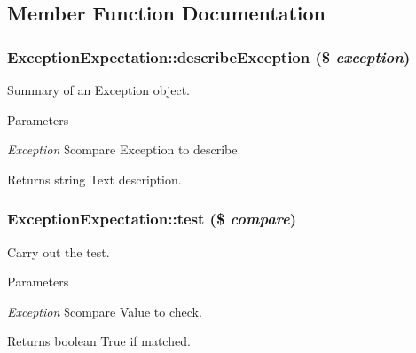 \subsection{Member Function Documentation}
\hypertarget{class_exception_expectation_a4f7a76d97a172afd6d3c60ce42ab01f6}{
\subsubsection[{describeException}]{\setlength{\rightskip}{0pt plus 5cm}ExceptionExpectation::describeException (\$ {\em exception})}}
\label{class_exception_expectation_a4f7a76d97a172afd6d3c60ce42ab01f6}
Summary of an Exception object. 
\begin{DoxyParams}{Parameters}
\item[{\em Exception}]\$compare Exception to describe. \end{DoxyParams}
\begin{DoxyReturn}{Returns}
string Text description. 
\end{DoxyReturn}
\hypertarget{class_exception_expectation_a302c92bdfd0dc2bb308e8f85628dbc2b}{
\subsubsection[{test}]{\setlength{\rightskip}{0pt plus 5cm}ExceptionExpectation::test (\$ {\em compare})}}
\label{class_exception_expectation_a302c92bdfd0dc2bb308e8f85628dbc2b}
Carry out the test. 
\begin{DoxyParams}{Parameters}
\item[{\em Exception}]\$compare Value to check. \end{DoxyParams}
\begin{DoxyReturn}{Returns}
boolean True if matched. 
\end{DoxyReturn}


